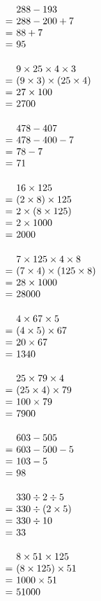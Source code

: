 \documentclass[UTF8]{ctexart}
\makeatletter
\newcommand{\cell}[2]{%
  \begin{minipage}[t][35mm][t]{0.315\textwidth}%
    \vspace{0pt}\linespread{1}#1\selectfont
    \strut#2%
  \end{minipage}%
}
\newcommand{\arow}[3]{%
  \noindent\cell{\zihao{-4}}{#1}\hfill
  \cell{\zihao{-4}}{#2}\hfill
  \cell{\zihao{-4}}{#3}\par\nointerlineskip
}
\newcommand{\eqgap}{0.35em}
\newcommand{\problemline}[1]{#1}
\newcommand{\solution}[1]{%
  \(\begin{array}[t]{@{}r@{\hspace{\eqgap}}l@{}}#1\end{array}\)%
}
\makeatother
\begin{document}
{\solution{
& \problemline{288-193} \\
= & 288-200+7 \\
= & 88+7 \\
= & 95
}}
\arow
{\solution{
& \problemline{9\times 25\times 4\times 3} \\
= & (9\times 3)\times (25\times 4) \\
= & 27\times 100 \\
= & 2700
}}
{\solution{
& \problemline{478-407} \\
= & 478-400-7 \\
= & 78-7 \\
= & 71
}}
{\solution{
& \problemline{16\times 125} \\
= & (2\times 8)\times 125 \\
= & 2\times (8\times 125) \\
= & 2\times 1000 \\
= & 2000
}}
\arow
{\solution{
& \problemline{7\times 125\times 4\times 8} \\
= & (7\times 4)\times (125\times 8) \\
= & 28\times 1000 \\
= & 28000
}}
{\solution{
& \problemline{4\times 67\times 5} \\
= & (4\times 5)\times 67 \\
= & 20\times 67 \\
= & 1340
}}
{\solution{
& \problemline{25\times 79\times 4} \\
= & (25\times 4)\times 79 \\
= & 100\times 79 \\
= & 7900
}}
\arow
{\solution{
& \problemline{603-505} \\
= & 603-500-5 \\
= & 103-5 \\
= & 98
}}
{\solution{
& \problemline{330\div 2\div 5} \\
= & 330\div (2\times 5) \\
= & 330\div 10 \\
= & 33
}}
{\solution{
& \problemline{8\times 51\times 125} \\
= & (8\times 125)\times 51 \\
= & 1000\times 51 \\
= & 51000
}}
\end{document}
